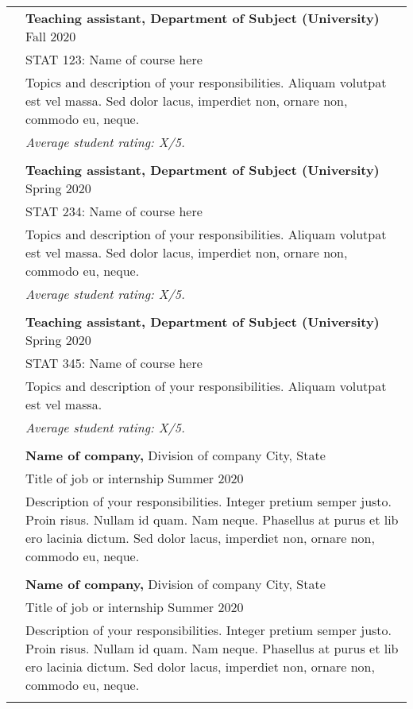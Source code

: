 \documentclass[letterpaper, 11pt]{article}
\begin{document}
\begin{longtable}{p{1.3in}p{4.8in}}
{\color{OliveGreen}{Teaching experience}} 
& \textbf{Teaching assistant, Department of Subject (University)} \hfill Fall 2020 \\
& STAT 123: Name of course here \\
& Topics and description of your responsibilities. Aliquam volutpat est vel massa. Sed dolor lacus, imperdiet non, ornare non, commodo eu, neque. \\
& \textit{Average student rating: X/5.} \\
& \\

& \textbf{Teaching assistant, Department of Subject (University)} \hfill Spring 2020 \\
& STAT 234: Name of course here \\
& Topics and description of your responsibilities. Aliquam volutpat est vel massa. Sed dolor lacus, imperdiet non, ornare non, commodo eu, neque. \\
& \textit{Average student rating: X/5.} \\
& \\

& \textbf{Teaching assistant, Department of Subject (University)} \hfill Spring 2020 \\
& STAT 345: Name of course here \\
& Topics and description of your responsibilities. Aliquam volutpat est vel massa. \\
& \textit{Average student rating: X/5.} \\
& \\


{\color{OliveGreen}{Industry experience}} 
& {\textbf{Name of company,}} Division of company \hfill City, State\\
& Title of job or internship \hfill Summer 2020 \\
& Description of your responsibilities. Integer pretium semper justo. Proin risus. Nullam id quam. Nam neque. Phasellus at purus et lib ero lacinia dictum. Sed dolor lacus, imperdiet non, ornare non, commodo eu, neque.\\
& \\
 
& {\textbf{Name of company,}} Division of company \hfill City, State\\
& Title of job or internship \hfill Summer 2020 \\
& Description of your responsibilities. Integer pretium semper justo. Proin risus. Nullam id quam. Nam neque. Phasellus at purus et lib ero lacinia dictum. Sed dolor lacus, imperdiet non, ornare non, commodo eu, neque.\\
& \\


\end{longtable}
\end{document}
